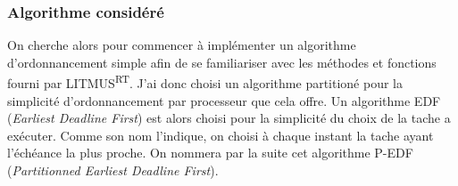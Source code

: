 \subsubsection{Algorithme considéré}

On cherche alors pour commencer à implémenter un algorithme d’ordonnancement simple afin de se familiariser avec les méthodes et fonctions fourni par LITMUS\textsuperscript{RT}. J'ai donc choisi un algorithme partitioné pour la simplicité d’ordonnancement par \gls{processeur} que cela offre. Un algorithme EDF (\textit{Earliest Deadline First}) est alors choisi pour la simplicité du choix de la tache a exécuter. Comme son nom l'indique, on choisi à chaque instant la tache ayant l'échéance la plus proche. On nommera par la suite cet algorithme P-EDF (\textit{Partitionned Earliest Deadline First}).

